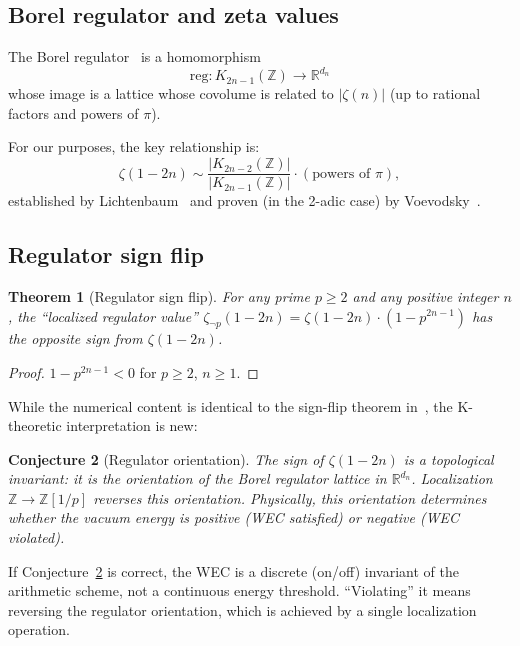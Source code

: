 \documentclass[aps,prd,twocolumn,superscriptaddress,nofootinbib]{revtex4-2}
\newtheorem{theorem}{Theorem}
\newtheorem{conjecture}[theorem]{Conjecture}
\newcommand{\Zp}{\mathbb{Z}[1/p]}
\begin{document}
\subsection{Borel regulator and zeta values}

The Borel regulator~\cite{Borel1977} is a homomorphism
\begin{equation}
  \mathrm{reg}: K_{2n-1}(\mathbb{Z}) \to \mathbb{R}^{d_n}
\end{equation}
whose image is a lattice whose covolume is related to
$|\zeta(n)|$ (up to rational factors and powers of $\pi$).

For our purposes, the key relationship is:
\begin{equation}
  \zeta(1-2n) \sim \frac{|K_{2n-2}(\mathbb{Z})|}{|K_{2n-1}(\mathbb{Z})|} \cdot (\text{powers of } \pi),
  \label{eq:lichtenbaum}
\end{equation}
established by Lichtenbaum~\cite{Lichtenbaum1973} and proven
(in the 2-adic case) by Voevodsky~\cite{Voevodsky2003}.

\subsection{Regulator sign flip}

\begin{theorem}[Regulator sign flip]
\label{thm:reg_flip}
For any prime $p \geq 2$ and any positive integer $n$,
the ``localized regulator value''
$\zeta_{\neg p}(1-2n) = \zeta(1-2n) \cdot (1 - p^{2n-1})$
has the opposite sign from $\zeta(1-2n)$.
\end{theorem}

\begin{proof}
$1 - p^{2n-1} < 0$ for $p \geq 2$, $n \geq 1$.
\end{proof}

While the numerical content is identical to the sign-flip
theorem in~\cite{paper_A}, the K-theoretic interpretation
is new:

\begin{conjecture}[Regulator orientation]
\label{conj:reg}
The sign of $\zeta(1-2n)$ is a topological invariant:
it is the \emph{orientation} of the Borel regulator lattice
in $\mathbb{R}^{d_n}$. Localization $\mathbb{Z} \to \Zp$
reverses this orientation.
Physically, this orientation determines whether the vacuum
energy is positive (WEC satisfied) or negative (WEC violated).
\end{conjecture}

If Conjecture~\ref{conj:reg} is correct, the WEC is a discrete
(on/off) invariant of the arithmetic scheme, not a continuous
energy threshold. ``Violating'' it means reversing the regulator
orientation, which is achieved by a single localization operation.
\end{document}
